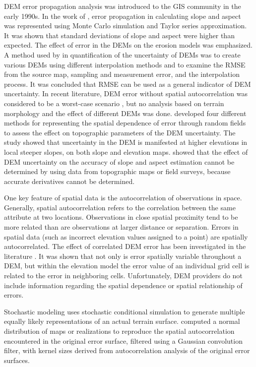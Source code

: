 \documentclass[12pt]{article}
\begin{document}
DEM error propagation analysis was introduced to the GIS community in
the early 1990s.  In the work of \citet{Heuvelink1990}, error
propagation in calculating slope and aspect was represented using
Monte Carlo simulation and Taylor series approximation. It was shown
that standard deviations of slope and aspect were higher than
expected.  The effect of error in the DEMs on the erosion models was
emphasized.  A method used by \citet{Qihao_Weng} in quantification of
the uncertainty of DEMs was to create various DEMs using different
interpolation methods and to examine the RMSE from the source map,
sampling and measurement error, and the interpolation process. It was
concluded that RMSE can be used as a general indicator of DEM
uncertainty.  In recent literature, DEM error without spatial
autocorrelation was considered to be a worst-case scenario
\citep{Heuvelink1989, VanNiel2004, Oksanen2006}, but no analysis based
on terrain morphology and the effect of different DEMs was done.
\citet{Wechsler2006} developed four different methods for representing
the spatial dependence of error through random fields to assess the
effect on topographic parameters of the DEM uncertainty. The study
showed that uncertainty in the DEM is manifested at higher elevations
in local steeper slopes, on both slope and elevation maps.
\citet{Florinsky1998} showed that the effect of DEM uncertainty on the
accuracy of slope and aspect estimation cannot be determined by using
data from topographic maps or field surveys, because accurate
derivatives cannot be determined.

One key feature of spatial data is the autocorrelation of observations
in space.  Generally, spatial autocorrelation refers to the
correlation between the same attribute at two locations. Observations
in close spatial proximity tend to be more related than are
observations at larger distance or separation. Errors in spatial data
(such as incorrect elevation values assigned to a point) are spatially
autocorrelated. The effect of correlated DEM error has been
investigated in the literature \citep{Fisher_1991, Goodchild_1992}. It
was shown that not only is error spatially variable throughout a DEM,
but within the elevation model the error value of an individual grid
cell is related to the error in neighboring cells. Unfortunately, DEM
providers do not include information regarding the spatial dependence
or spatial relationship of errors.

Stochastic modeling uses stochastic conditional simulation to generate
multiple equally likely representations of an actual terrain
surface. \citet{Hunter_Goodchild_1997, Ehlschlaeger_1996} computed a
normal distribution of maps or realizations to reproduce the spatial
autocorrelation encountered in the original error surface, filtered
using a Gaussian convolution filter, with kernel sizes derived from
autocorrelation analysis of the original error surfaces.
\end{document}
